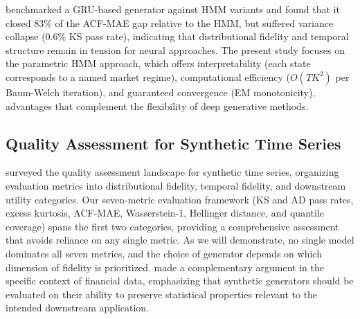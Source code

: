 \citet{alswaidan2026hybrid} benchmarked a GRU-based generator against HMM variants and found that it closed 83\% of the ACF-MAE gap relative to the HMM, but suffered variance collapse (0.6\% KS pass rate), indicating that distributional fidelity and temporal structure remain in tension for neural approaches.
The present study focuses on the parametric HMM approach, which offers interpretability (each state corresponds to a named market regime), computational efficiency ($O(TK^2)$ per Baum-Welch iteration), and guaranteed convergence (EM monotonicity), advantages that complement the flexibility of deep generative methods.

\subsection{Quality Assessment for Synthetic Time Series}

\citet{stenger2024thinking} surveyed the quality assessment landscape for synthetic time series, organizing evaluation metrics into distributional fidelity, temporal fidelity, and downstream utility categories.
Our seven-metric evaluation framework (KS and AD pass rates, excess kurtosis, ACF-MAE, Wasserstein-1, Hellinger distance, and quantile coverage) spans the first two categories, providing a comprehensive assessment that avoids reliance on any single metric.
As we will demonstrate, no single model dominates all seven metrics, and the choice of generator depends on which dimension of fidelity is prioritized.
\citet{assefa2020generating} made a complementary argument in the specific context of financial data, emphasizing that synthetic generators should be evaluated on their ability to preserve statistical properties relevant to the intended downstream application.
